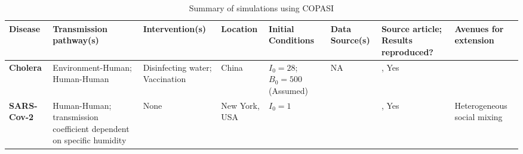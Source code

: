 \begin{landscape}
\begin{table}
    \centering
   \begin{tabular}{|p{}|p{}|p{}|p{}|p{}|p{}|p{}|p{}|}
   \hline
        \textbf{Disease} & \textbf{Transmission pathway(s)} & \textbf{Intervention(s)} & \textbf{Location} & \textbf{Initial Conditions} & \textbf{Data Source(s)} & \textbf{Source article; Results reproduced?} & \textbf{Avenues for extension}\\ \hline
        \textbf{Cholera} & Environment-Human; Human-Human & Disinfecting water; Vaccination & China & $I_0 = 28$; $B_0 = 500$ (Assumed) & NA &\cite{sun2017transmission}, Yes &   
        \\ \hline
        \textbf{SARS-Cov-2}& Human-Human; transmission coefficient dependent on specific humidity & None & New York, USA & $I_0 = 1$ & \cite{era5} & \cite{baker2020susceptible}, Yes & Heterogeneous social mixing\\ \hline
    \end{tabular}
    \caption{Summary of simulations using COPASI}
    \label{tab:summary}
\end{table}
\end{landscape}